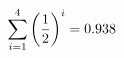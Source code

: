 \documentclass[preview]{standalone}
\begin{document}
\begin{align*}
\sum_{i=1}^{ 4 } \left({ 1 } \over {2} \right)^i = { 0.938 }
\end{align*}
\end{document}
